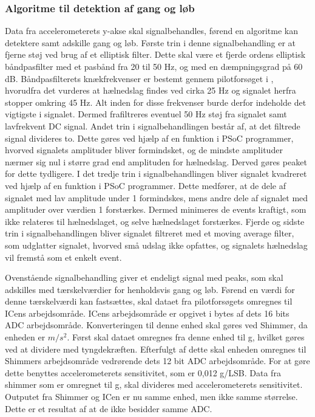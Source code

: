 \subsubsection{Algoritme til detektion af gang og løb}
Data fra accelerometerets y-akse skal signalbehandles, førend en algoritme kan detektere samt adskille gang og løb. Første trin i denne signalbehandling er at fjerne støj ved brug af et elliptisk filter. Dette skal være et fjerde ordens elliptisk båndpasfilter med et pasbånd fra 20 til 50 Hz, og med en dæmpningsgrad på 60 dB. Båndpasfilterets knækfrekvenser er bestemt gennem pilotforsøget i , hvorudfra det vurderes at hælnedslag findes ved cirka 25 Hz og signalet herfra stopper omkring 45 Hz. Alt inden for disse frekvenser burde derfor indeholde det vigtigste i signalet. Dermed frafiltreres eventuel 50 Hz støj fra signalet samt lavfrekvent DC signal. %
Andet trin i signalbehandlingen består af, at det filtrede signal divideres to. Dette gøres ved hjælp af en funktion i PSoC programmer, hvorved signalets amplituder bliver formindsket, og de mindste amplituder nærmer sig nul i større grad end amplituden for hælnedslag. Derved gøres peaket for dette tydligere. I det tredje trin i signalbehandlingen bliver signalet kvadreret ved hjælp af en funktion i PSoC programmer. Dette medfører, at de dele af signalet med lav amplitude under 1 formindskes, mens andre dele af signalet med amplituder over værdien 1 forstærkes. Dermed minimeres de events kraftigt, som ikke relateres til hælnedslaget, og selve hælnedslaget forstærkes. Fjerde og sidste trin i signalbehandlingen bliver signalet filtreret med et moving average filter, som udglatter signalet, hvorved små udslag ikke opfattes, og signalets hælnedslag vil fremstå som et enkelt event.

Ovenstående signalbehandling giver et endeligt signal med peaks, som skal adskilles med tærskelværdier for henholdsvis gang og løb. Førend en værdi for denne tærskelværdi kan fastsættes, skal dataet fra pilotforsøgets omregnes til ICens arbejdsområde. ICens arbejdsområde er opgivet i bytes af dets 16 bits ADC arbejdsområde. Konverteringen til denne enhed skal gøres ved Shimmer, da enheden er $m/s^{2}$. Først skal dataet omregnes fra denne enhed til g, hvilket gøres ved at dividere med tyngdekræften. Efterfulgt af dette skal enheden omregnes til Shimmers arbejdsområde vedrørende dets 12 bit ADC arbejdsområde. For at gøre dette benyttes accelerometerets sensitivitet, som er 0,012 g/LSB. Data fra shimmer som er omregnet til g, skal divideres med accelerometerets sensitivitet. Outputet fra Shimmer og ICen er nu samme enhed, men ikke samme størrelse. Dette er et resultat af at de ikke besidder samme ADC.
 
